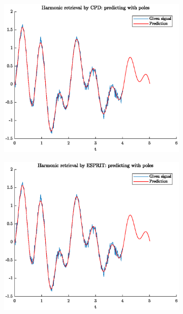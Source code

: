 \documentclass[pagesize,english,DIV=calc,footinclude=false
]{scrartcl}
\begin{document}
\begin{figure}[htbp]
  \centering
  \begin{subfigure}[b]{0.32\linewidth}
    \includegraphics[width=\linewidth]{HR_pred1.eps}
  \end{subfigure}
  \begin{subfigure}[b]{0.32\linewidth}
    \includegraphics[width=\linewidth]{HR_pred2.eps}
  \end{subfigure}
  \begin{subfigure}[b]{0.32\linewidth}

\end{subfigure}
\end{figure}
\end{document}
